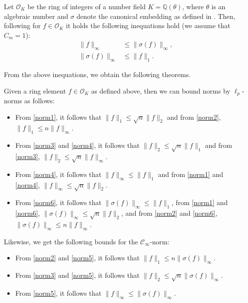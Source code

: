 Let $\mathcal{O}_K$ be the ring of integers of a number field $K=\mathbb{Q}(\theta)$, where $\theta$ is an algebraic number and $\sigma$ denote the canonical embedding as defined in \cite{DPSZ12}. Then, following \cite{DPSZ12} for $f \in \mathcal{O}_K$ it holds the following inequations hold (we assume that $C_m = 1$): %
\begin{align}
    \| f \|_\infty         & \leq \| \sigma(f) \|_\infty \label{norm5}, \\
    \| \sigma(f) \|_\infty & \leq \| f \|_1 \label{norm6}.
\end{align}

From the above inequations, we obtain the following theorems.
\begin{theorem}\label{th:norm-rel}
    Given a ring element $f \in \mathcal{O}_K$ as defined above, then we can bound norms by $\ell_p$-norms as follows:
    \begin{itemize}
        \item From \cref{norm1}, it follows that $\| f \|_1 \leq \sqrt{n} \| f \|_2$ and from \cref{norm2}, $\| f \|_1 \leq n \| f \|_\infty$.
        \item From \cref{norm3} and \cref{norm4}, it follows that $\| f \|_2 \leq \sqrt{n}  \| f \|_1$ and from \cref{norm3}, $\| f \|_2 \leq \sqrt{n}  \| f \|_\infty$.
        \item From \cref{norm4}, it follows that $\| f \|_\infty \leq  \| f \|_1$ and from \cref{norm1} and \cref{norm4}, $\| f \|_\infty \leq \sqrt{n}  \| f \|_2$.
        \item From \cref{norm6}, it follows that $\| \sigma(f) \|_\infty \leq  \| f \|_1$, from \cref{norm1} and \cref{norm6}, $\| \sigma(f) \|_\infty \leq \sqrt{n}  \| f \|_2$, and from \cref{norm2} and \cref{norm6}, $\| \sigma(f) \|_\infty \leq n  \| f \|_\infty$.
    \end{itemize}
    Likewise, we get the following bounds for the $\mathcal{C}_\infty$-norm:
    \begin{itemize}
        \item From \cref{norm2} and \cref{norm5}, it follows that $\| f \|_1 \leq  n \| \sigma(f) \|_\infty$.
        \item From \cref{norm3} and \cref{norm5}, it follows that $\| f \|_2 \leq  \sqrt{n} \| \sigma(f) \|_\infty$.
        \item From \cref{norm5}, it follows that $\| f \|_\infty \leq  \| \sigma(f) \|_\infty$.
    \end{itemize}
\end{theorem}

